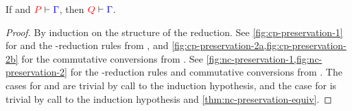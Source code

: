 \begin{theorem}[Preservation]\label{thm:nc-preservation}
  If  and $\seq[{ P }]{ \Gamma }$, then $\seq[{ Q }]{ \Gamma }$.
\end{theorem}
\begin{proof}
  By induction on the structure of the reduction. See
  \cref{fig:cp-preservation-1} for  and the \textbeta-reduction
  rules from \cp, and \cref{fig:cp-preservation-2a,fig:cp-preservation-2b} for the
  commutative conversions from \cp.
  See \cref{fig:nc-preservation-1,fig:nc-preservation-2} for the
  \textbeta-reduction rules and commutative conversions from \nodcap.
  The cases for \cpRedGammaCut and \ncRedGammaPool are trivial by call to the
  induction hypothesis, and the case for \cpRedGammaEquiv is trivial by call to
  the induction hypothesis and \cref{thm:nc-preservation-equiv}.
\end{proof}
